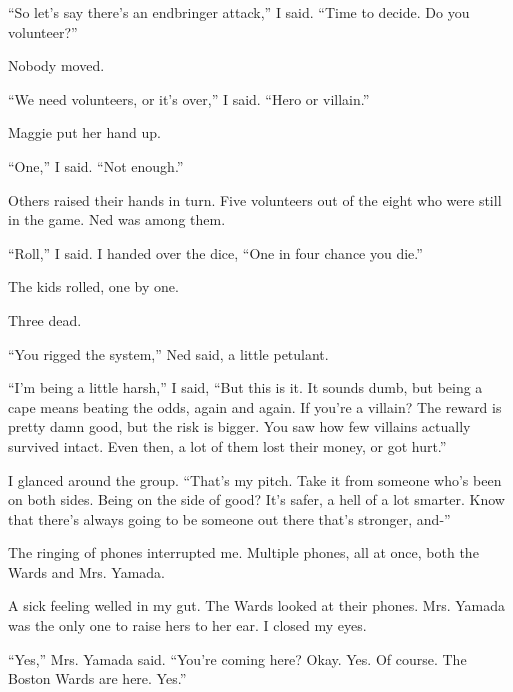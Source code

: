 ``So let's say there's an endbringer attack,'' I said.  ``Time to decide.  Do you volunteer?''



Nobody moved.



``We need volunteers, or it's over,'' I said.  ``Hero or villain.''



Maggie put her hand up.



``One,'' I said.  ``Not enough.''



Others raised their hands in turn.  Five volunteers out of the eight who were still in the game.  Ned was among them.



``Roll,'' I said.  I handed over the dice, ``One in four chance you die.''



The kids rolled, one by one.



Three dead.



``You rigged the system,'' Ned said, a little petulant.



``I'm being a little harsh,'' I said, ``But this is it.  It sounds dumb, but being a cape means beating the odds, again and again.  If you're a villain?  The reward is pretty damn good, but the risk is bigger.  You saw how few villains actually survived intact.  Even then, a lot of them lost their money, or got hurt.''



I glanced around the group.  ``That's my pitch.  Take it from someone who's been on both sides.  Being on the side of good?  It's safer, a hell of a lot smarter.  Know that there's always going to be someone out there that's stronger, and-''



The ringing of phones interrupted me.  Multiple phones, all at once, both the Wards and Mrs. Yamada.



A sick feeling welled in my gut.  The Wards looked at their phones.  Mrs. Yamada was the only one to raise hers to her ear.  I closed my eyes.



``Yes,'' Mrs. Yamada said.  ``You're coming here?  Okay.  Yes.  Of course.  The Boston Wards are here.  Yes.''




